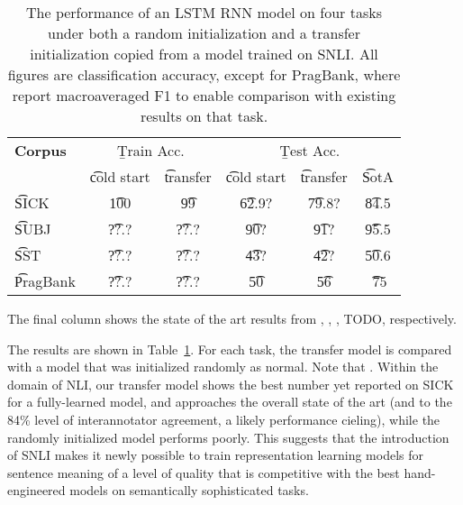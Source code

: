 \begin{table}
\begin{center}
\begin{tabular}{l@{\hskip \colspaceL}c@{\hskip \colspaceS}c@{\hskip \colspaceS}c@{\hskip \colspaceS}c@{\hskip \colspaceS}c}
\hline
\textbf{Corpus} & \multicolumn{2}{c}{\b{Train Acc.}} &\multicolumn{3}{c}{ \b{Test Acc.}} \\
 & \t{cold start} & \t{transfer} & \t{cold start} & \t{transfer} & \t{SotA} \\
\hline
\t{SICK}            & \t{100} & \t{99} & \t{62.9?} & \t{79.8?} & \t{84.5} \\
\t{SUBJ}          & \t{??.?} & \t{??.?} & \t{90?} & \t{91?}& \t{95.5} \\
\t{SST}          & \t{??.?} & \t{??.?} & \t{43?} & \t{42?} & \t{50.6}\\
\t{PragBank}          & \t{??.?} & \t{??.?} & \t{50} & \t{56}& \t{~75} \\
\hline
\end{tabular}
\end{center}

\caption{\label{tab:transferresults}
The performance of an LSTM RNN model on four tasks under both a random initialization and a transfer initialization copied from a model trained on SNLI. All figures are classification accuracy, except for PragBank, where report macroaveraged F1 to enable comparison with existing results on that task. } 

\end{table}

The final column shows the state of the art results from \cite{lai2014illinois}, \cite{zhao2015self}, \cite{tai2015improved}, TODO, respectively.

The results are shown in Table~\ref{tab:transferresults}. For each task, the transfer model is compared with a model that was initialized randomly as normal. Note that . Within the domain of NLI, our transfer model shows the best number yet reported on SICK for a fully-learned model, and approaches the overall state of the art (and to the 84\% level of interannotator agreement, a likely performance cieling), while the randomly initialized model performs poorly. This suggests that the introduction of SNLI makes it newly possible to train representation learning models for sentence meaning of a level of quality that is competitive with the best hand-engineered models on semantically sophisticated tasks.

